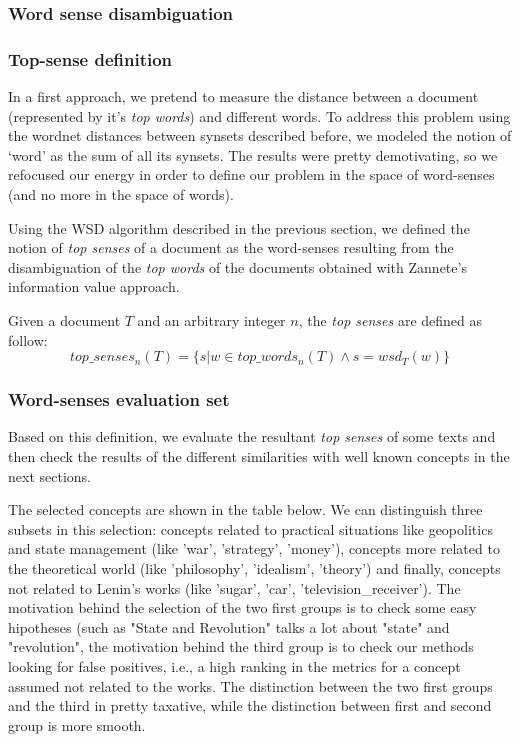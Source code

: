 \documentclass{pnastwo}
\newcommand\sq[1]{\textquoteleft #1\textquoteright}
\begin{document}
\begin{article}
\subsubsection{Word sense disambiguation}

\subsubsection{Top-sense definition}

In a first approach, we pretend to measure the distance between a document (represented by it's \textit{top words}) and different words. To address this problem using the wordnet distances between synsets described before, we modeled the notion of \sq{word} as the sum of all its synsets. The results were pretty demotivating, so we refocused our energy in order to define our problem in the space of word-senses (and no more in the space of words). 

Using the WSD algorithm described in the previous section, we defined the notion of \textit{top senses} of a document as the word-senses resulting from the disambiguation of the \textit{top words} of the documents obtained with Zannete's information value approach.

Given a document $T$ and an arbitrary integer $n$, the \textit{top senses} are defined as follow:
\begin{equation}
  top\_senses_{n}(T) = \{s | w \in top\_words_{n}(T) \wedge  s = wsd_T(w)\}
\end{equation}

\subsubsection{Word-senses evaluation set}

Based on this definition, we evaluate the resultant \textit{top senses} of some texts and then check the results of the different similarities with well known concepts in the next sections.

The selected concepts are shown in the table below. We can distinguish three subsets in this selection: concepts related to practical situations like geopolitics and state management (like 'war', 'strategy', 'money'), concepts more related to the theoretical world (like 'philosophy', 'idealism', 'theory') and finally, concepts not related to Lenin's works (like 'sugar', 'car', 'television\_receiver'). The motivation behind the selection of the two first groups is to check some easy hipotheses (such as "State and Revolution" talks a lot about "state" and "revolution", the motivation behind the third group is to check our methods looking for false positives, i.e., a high ranking in the metrics for a concept assumed not related to the works. The distinction between the two first groups and the third in pretty taxative, while the distinction between first and second group is more smooth.


\end{article}
\end{document}
